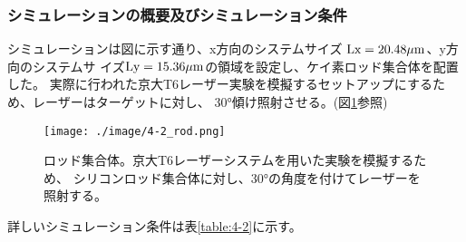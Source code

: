 \documentclass[a4paper,11pt,titlepage]{jsarticle}
\begin{document}
    \subsubsection{シミュレーションの概要及びシミュレーション条件}
    シミュレーションは図に示す通り、x方向のシステムサイズ $\rm{Lx = 20.48 \mu m}$、y方向のシステムサ
    イズ$\rm{Ly = 15.36 \mu m}$の領域を設定し、ケイ素ロッド集合体を配置した。
    実際に行われた京大T6レーザー実験を模擬するセットアップにするため、レーザーはターゲットに対し、
    30°傾け照射させる。(図\ref{fig:4-2_rod}参照)
    \begin{figure}[H]
      \begin{center}
        \texttt{[image: ./image/4-2\_rod.png]}
        \caption{
          \label{fig:4-2_rod}
            ロッド集合体。京大T6レーザーシステムを用いた実験を模擬するため、
            シリコンロッド集合体に対し、30°の角度を付けてレーザーを照射する。
        }
      \end{center}
    \end{figure} 
    詳しいシミュレーション条件は表\ref{table:4-2}に示す。
\end{document}
